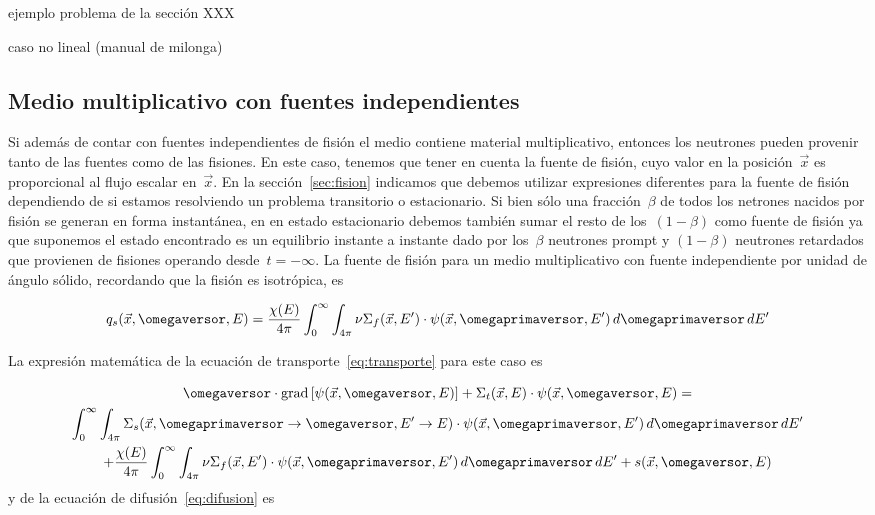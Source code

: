 {\color{red}ejemplo problema de la sección XXX}

{\color{red}caso no lineal (manual de milonga)}


\subsection{Medio multiplicativo con fuentes independientes} %
\label{sec:multiplicativoconfuente}

Si además de contar con fuentes independientes de fisión el medio contiene material multiplicativo, entonces los neutrones pueden provenir tanto de las fuentes como de las fisiones. En este caso, tenemos que tener en cuenta la fuente de fisión, cuyo valor en la posición~$\vec{x}$ es proporcional al flujo escalar en~$\vec{x}$. En la sección~\ref{sec:fision} indicamos que debemos utilizar expresiones diferentes para la fuente de fisión dependiendo de si estamos resolviendo un problema transitorio o estacionario. Si bien sólo una fracción~$\beta$ de todos los netrones nacidos por fisión se generan en forma instantánea, en en estado estacionario debemos también sumar el resto de los~$(1-\beta)$ como fuente de fisión ya que suponemos el estado encontrado es un equilibrio instante a instante dado por los~$\beta$ neutrones prompt y $(1-\beta)$ neutrones retardados que provienen de fisiones operando desde~$t=-\infty$. La fuente de fisión para un medio multiplicativo con fuente independiente por unidad de ángulo sólido, recordando que la fisión es isotrópica, es

\begin{equation}\label{eq:fisionconfuentes}
q_s(\vec{x}, \omegaversor, E) = \frac{\chi(E)}{4\pi} \int_{0}^{\infty} \int_{4\pi} \nu\Sigma_f(\vec{x}, E^\prime) \cdot \psi(\vec{x}, \omegaprimaversor, E^\prime) \, d\omegaprimaversor \, dE^\prime  
\end{equation}


La expresión matemática de la ecuación de transporte~\eqref{eq:transporte} para este caso es  

\begin{multline}
\label{eq:transportemmfi}
 \omegaversor \cdot \text{grad} \left[ \psi(\vec{x}, \omegaversor, E) \right]
 + \Sigma_t(\vec{x}, E) \cdot \psi(\vec{x}, \omegaversor, E) = \\
 \int_{0}^{\infty} \int_{4\pi} \Sigma_s(\vec{x}, \omegaprimaversor \rightarrow \omegaversor, E^\prime \rightarrow E) \cdot \psi(\vec{x}, \omegaprimaversor, E^\prime) \, d\omegaprimaversor \, dE^\prime \\
+ \frac{\chi(E)}{4\pi} \int_{0}^{\infty} \int_{4\pi} \nu\Sigma_f(\vec{x}, E^\prime) \cdot \psi(\vec{x}, \omegaprimaversor, E^\prime) \, d\omegaprimaversor \, dE^\prime 
+ s(\vec{x}, \omegaversor, E)
\end{multline}
%
y de la ecuación de difusión~\eqref{eq:difusion} es


